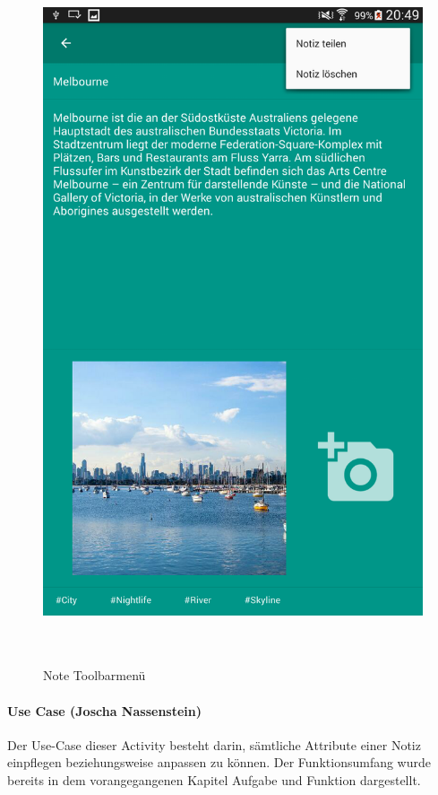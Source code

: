 \begin{figure}[H]
\centering
\begin{minipage}[t]{1\textwidth} %
\caption{Note Toolbarmenü} %
\includegraphics[height=20cm]{img/note_toolbarMenu}\\ %
\end{minipage}
\end{figure}

\paragraph{Use Case (Joscha Nassenstein)}
Der Use-Case dieser Activity besteht darin, sämtliche Attribute einer Notiz einpflegen beziehungsweise anpassen zu können. Der Funktionsumfang wurde bereits in dem vorangegangenen Kapitel Aufgabe und Funktion dargestellt.

